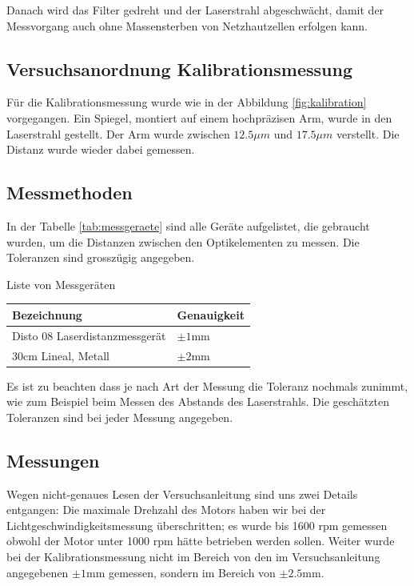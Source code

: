 Danach  wird  das  Filter  gedreht und der Laserstrahl abgeschw\"acht, damit der
Messvorgang   auch   ohne   Massensterben   von  Netzhautzellen  erfolgen  kann.


\subsection{Versuchsanordnung Kalibrationsmessung}

F\"ur die Kalibrationsmessung wurde wie in  der  Abbildung \ref{fig:kalibration}
vorgegangen.  Ein  Spiegel,  montiert auf einem hochpr\"azisen Arm, wurde in den
Laserstrahl  gestellt.  Der   Arm   wurde   zwischen   $12.5\mu m$   und
$17.5\mu m$  verstellt.   Die   Distanz  wurde  wieder  dabei  gemessen.

\subsection{Messmethoden}

In  der  Tabelle  \ref{tab:messgeraete}  sind  alle  Ger\"ate  aufgelistet,  die
gebraucht  wurden,  um  die Distanzen zwischen den Optikelementen zu messen. Die
Toleranzen  sind grossz\"ugig angegeben.

\begin{center}
    \begin{threeparttable}
        \caption{Liste von Messger\"aten}
        \label{tab:messgeraete}
        \begin{tabular}{ll}
            \toprule
            Bezeichnung                         & Genauigkeit \\
            \midrule
            Disto 08 Laserdistanzmessger\"at    & $\pm1\textrm{mm}$ \\
            $30\textrm{cm}$ Lineal, Metall      & $\pm2\textrm{mm}$ \\
            \bottomrule
        \end{tabular}
    \end{threeparttable}
\end{center}

Es ist zu beachten dass je nach Art der
Messung die Toleranz nochmals zunimmt, wie zum Beispiel beim Messen des Abstands
des Laserstrahls. Die gesch\"atzten Toleranzen sind bei jeder Messung angegeben.


\subsection{Messungen}

Wegen nicht-genaues Lesen der Versuchsanleitung sind uns zwei Details entgangen:
Die  maximale Drehzahl des Motors haben wir bei der Lichtgeschwindigkeitsmessung
\"uberschritten;  es wurde bis 1600 rpm gemessen obwohl der Motor unter 1000 rpm
h\"atte  betrieben werden sollen. Weiter wurde bei der Kalibrationsmessung nicht
im  Bereich von den im Versuchsanleitung angegebenen $\pm1\textrm{mm}$ gemessen,
sondern im Bereich von $\pm2.5\textrm{mm}$.


